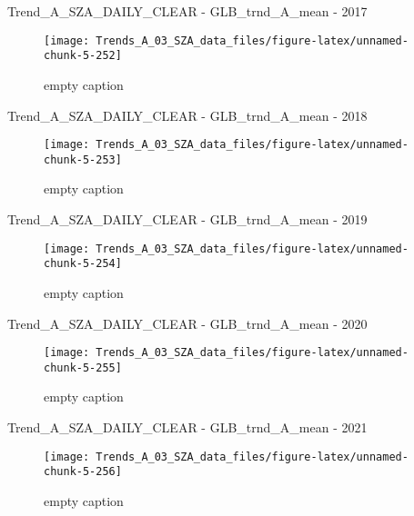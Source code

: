 \documentclass[
  10pt,
  a4paper,oneside]{article}
\begin{document}
Trend\_A\_SZA\_DAILY\_CLEAR - GLB\_trnd\_A\_mean - 2017

\begin{figure}[!ht]

{\centering \texttt{[image: Trends\_A\_03\_SZA\_data\_files/figure-latex/unnamed-chunk-5-252]} 

}

\caption{ empty caption }\label{fig:unnamed-chunk-5-252}
\end{figure}

Trend\_A\_SZA\_DAILY\_CLEAR - GLB\_trnd\_A\_mean - 2018

\begin{figure}[!ht]

{\centering \texttt{[image: Trends\_A\_03\_SZA\_data\_files/figure-latex/unnamed-chunk-5-253]} 

}

\caption{ empty caption }\label{fig:unnamed-chunk-5-253}
\end{figure}

Trend\_A\_SZA\_DAILY\_CLEAR - GLB\_trnd\_A\_mean - 2019

\begin{figure}[!ht]

{\centering \texttt{[image: Trends\_A\_03\_SZA\_data\_files/figure-latex/unnamed-chunk-5-254]} 

}

\caption{ empty caption }\label{fig:unnamed-chunk-5-254}
\end{figure}

Trend\_A\_SZA\_DAILY\_CLEAR - GLB\_trnd\_A\_mean - 2020

\begin{figure}[!ht]

{\centering \texttt{[image: Trends\_A\_03\_SZA\_data\_files/figure-latex/unnamed-chunk-5-255]} 

}

\caption{ empty caption }\label{fig:unnamed-chunk-5-255}
\end{figure}

Trend\_A\_SZA\_DAILY\_CLEAR - GLB\_trnd\_A\_mean - 2021

\begin{figure}[!ht]

{\centering \texttt{[image: Trends\_A\_03\_SZA\_data\_files/figure-latex/unnamed-chunk-5-256]} 

}

\caption{ empty caption }\label{fig:unnamed-chunk-5-256}
\end{figure}
\end{document}
